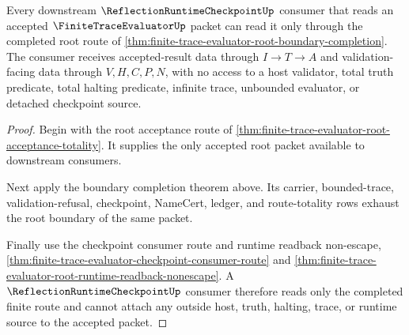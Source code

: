 \begin{theorem}
\label{thm:finite-trace-evaluator-root-consumer-readiness-lock}
Every downstream $\ReflectionRuntimeCheckpointUp$ consumer that reads an
accepted $\FiniteTraceEvaluatorUp$ packet can read it only through the
completed root route of
\autoref{thm:finite-trace-evaluator-root-boundary-completion}. The consumer
receives accepted-result data through $I \to T \to A$ and validation-facing
data through $V,H,C,P,N$, with no access to a host validator, total truth
predicate, total halting predicate, infinite trace, unbounded evaluator, or
detached checkpoint source.
\end{theorem}
\begin{proof}
Begin with the root acceptance route of
\autoref{thm:finite-trace-evaluator-root-acceptance-totality}. It supplies the
only accepted root packet available to downstream consumers.

Next apply the boundary completion theorem above. Its carrier, bounded-trace,
validation-refusal, checkpoint, NameCert, ledger, and route-totality rows
exhaust the root boundary of the same packet.

Finally use the checkpoint consumer route and runtime readback non-escape,
\autoref{thm:finite-trace-evaluator-checkpoint-consumer-route} and
\autoref{thm:finite-trace-evaluator-root-runtime-readback-nonescape}. A
$\ReflectionRuntimeCheckpointUp$ consumer therefore reads only the completed
finite route and cannot attach any outside host, truth, halting, trace, or
runtime source to the accepted packet.
\end{proof}
